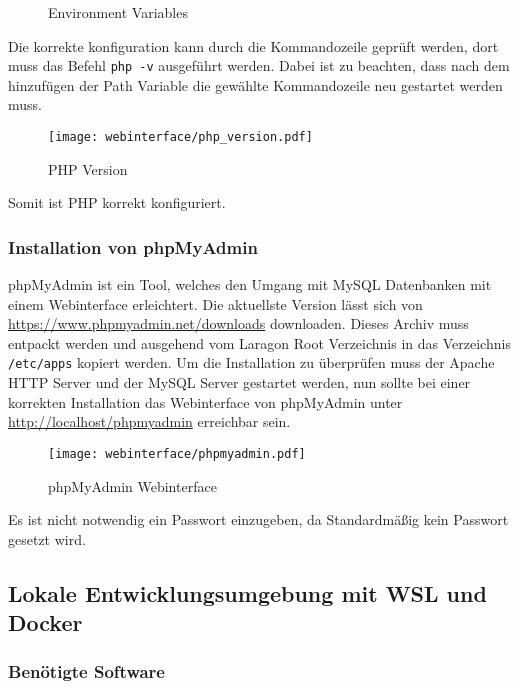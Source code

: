 \begin{figure}[H]
  \centering
  \caption{Environment Variables}
\end{figure}

Die korrekte konfiguration kann durch die Kommandozeile geprüft werden, dort
muss das Befehl \verb|php -v| ausgeführt werden. Dabei ist zu beachten, dass
nach dem hinzufügen der Path Variable die gewählte Kommandozeile neu gestartet
werden muss.

\begin{figure}[H]
  \centering
  \texttt{[image: webinterface/php\_version.pdf]}
  \caption{PHP Version}
\end{figure}

Somit ist PHP korrekt konfiguriert.


\subsubsection{Installation von phpMyAdmin}
phpMyAdmin ist ein Tool, welches den Umgang mit MySQL Datenbanken mit einem
Webinterface erleichtert. Die aktuellste Version lässt sich von
\url{https://www.phpmyadmin.net/downloads} downloaden. Dieses Archiv muss
entpackt werden und ausgehend vom Laragon Root Verzeichnis in das Verzeichnis
\verb|/etc/apps| kopiert werden. Um die Installation zu überprüfen muss der
Apache HTTP Server und der MySQL Server gestartet werden, nun sollte bei einer
korrekten Installation das Webinterface von phpMyAdmin unter
\url{http://localhost/phpmyadmin} erreichbar sein.

\begin{figure}[H]
  \centering
  \texttt{[image: webinterface/phpmyadmin.pdf]}
  \caption{phpMyAdmin Webinterface}
\end{figure}

Es ist nicht notwendig ein Passwort einzugeben, da Standardmäßig kein Passwort
gesetzt wird.


\subsection{Lokale Entwicklungsumgebung mit WSL und Docker}


\subsubsection{Benötigte Software}

